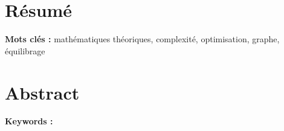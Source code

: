 \chapter*{Résumé}

\textbf{Mots clés :} mathématiques théoriques, complexité, optimisation, graphe, équilibrage

\chapter*{Abstract}

\textbf{Keywords :}
